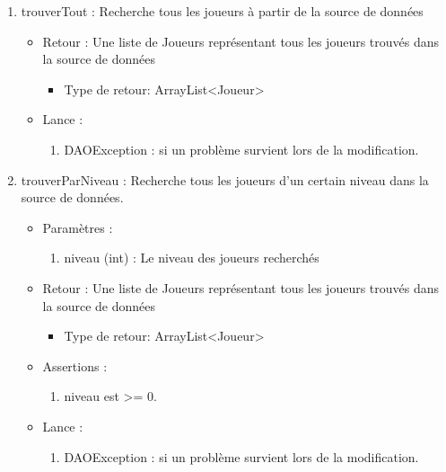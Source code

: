 \begin{itemize}
\begin{enumerate}
  \item trouverTout : Recherche tous les joueurs à partir de la source de données
    \begin{itemize}
    \item Retour : Une liste de Joueurs représentant tous les joueurs trouvés dans la source de données
      \begin{itemize}
      \item Type de retour: ArrayList<Joueur>
      \end{itemize}
    \item Lance :
      \begin{enumerate}
      \item DAOException : si un problème survient lors de la modification.
      \end{enumerate}
    \end{itemize}
    
  \item trouverParNiveau : Recherche tous les joueurs d'un certain niveau dans la source de données.
    \begin{itemize}
    \item Paramètres : 
      \begin{enumerate}
      \item niveau (int) : Le niveau des joueurs recherchés
      \end{enumerate}
    \item Retour : Une liste de Joueurs représentant tous les joueurs trouvés dans la source de données
      \begin{itemize}
      \item Type de retour: ArrayList<Joueur>
      \end{itemize}
    \item Assertions : 
      \begin{enumerate}
      \item niveau est >= 0.
      \end{enumerate}
    \item Lance :
      \begin{enumerate}
      \item DAOException : si un problème survient lors de la modification.
      \end{enumerate}
    \end{itemize}
  \end{enumerate}
\end{itemize}

